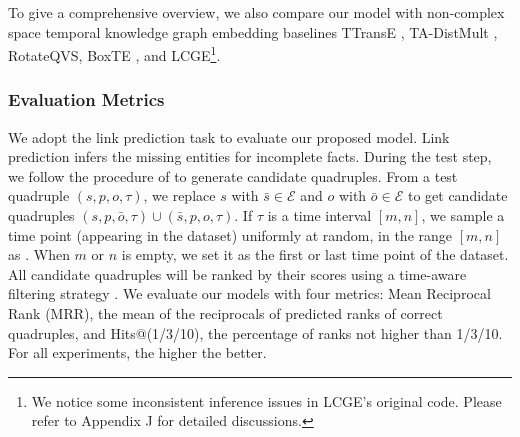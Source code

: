 \documentclass[letterpaper]{article} %
\begin{document}
To give a comprehensive overview, we also compare our model with non-complex space temporal knowledge graph embedding baselines TTransE \cite{garcia2018learning},  TA-DistMult \cite{leblay2018deriving}, RotateQVS\cite{chen2022rotateqvs}, BoxTE \cite{messner2022temporal}, and LCGE\cite{niu2022logic}\footnote{We notice some inconsistent inference issues in LCGE's original code. Please refer to Appendix J for detailed discussions.}.


\subsubsection{Evaluation Metrics}
We adopt the link prediction task to evaluate our proposed model. Link prediction infers the missing entities for incomplete facts.
During the test step, we follow the procedure of \cite{xu2020tero} to generate candidate quadruples. From a test quadruple $(s,p,o, \tau)$, we replace $s$ with $\bar{s} \in \mathcal{E}$ and $o$ with $\bar{o} \in \mathcal{E}$ to get candidate quadruples $(s,p,\bar{o}, \tau) \cup (\bar{s},p,o, \tau)$.  If $\tau$ is a time interval $[m,n]$, we sample a time point (appearing in the dataset) uniformly at random, in the range $[m,n]$ as \cite{lacroix2019tensor}. When $m$ or $n$ is empty, we set it as the first or last time point of the dataset. All candidate quadruples will be ranked by their scores using a time-aware filtering strategy \cite{goel2020diachronic}. We evaluate our models with four metrics: Mean Reciprocal Rank (MRR), the mean of the reciprocals of predicted ranks of correct quadruples, and Hits@(1/3/10), the percentage of ranks not higher than 1/3/10. For all experiments, the higher the better.
\end{document}
